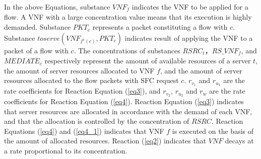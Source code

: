 \documentclass[technicalreport]{ieicej}
\begin{document}
	In the above Equations, substance $\mathit{VNF_f}$ indicates the VNF to be applied for a flow.
	A VNF with a large concentration value means that its execution is highly demanded.
	Substance $\mathit{PKT_c}$ represents a packet constituting a flow with $c$.
	Substance $\mathit{toserve(VNF_{f^1(c)}, PKT_c)}$ indicates result of applying the VNF to a packet of a flow with $c$.
	The concentrations of substances $\mathit{RSRC_t}$，$\mathit{RS\_VNF_f}$, and $\mathit{MEDIATE_c}$ respectively represent the amount of available resources of a server $t$, the amount of server resources allocated to VNF $f$, and the amount of server resources allocated to the flow packets with SFC request $c$.
	$r_{v_1}$ and $r_{u_1}$ are the rate coefficients for Reaction Equation (\ref{eq3}), and $r_{v_2}$, $r_{u_2}$ and $r_w$ are the rate coefficients for Reaction Equation (\ref{eq4}).
	Reaction Equation (\ref{eq3}) indicates that server resources are allocated in accordance with the demand of each VNF, and that the allocation is controlled by the concentration of $\mathit{RSRC}$.
	Reaction Equations (\ref{eq4}) and (\ref{eq4_1}) indicates that VNF $f$ is executed on the basis of the amount of allocated resources.
	Reaction (\ref{eq2}) indicates that $\mathit{VNF}$ decays at a rate proportional to its concentration.
\end{document}
